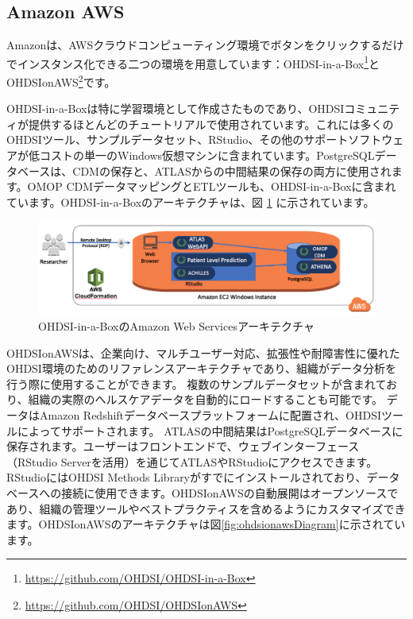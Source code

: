 \documentclass[
  11pt]{book}
\theoremstyle{definition}
\theoremstyle{definition}
\theoremstyle{definition}
\theoremstyle{definition}
\theoremstyle{remark}
\begin{document}
\subsection{Amazon AWS}\label{amazon-aws}

Amazonは、AWSクラウドコンピューティング環境でボタンをクリックするだけでインスタンス化できる二つの環境を用意しています：OHDSI-in-a-Box\footnote{\url{https://github.com/OHDSI/OHDSI-in-a-Box}}とOHDSIonAWS\footnote{\url{https://github.com/OHDSI/OHDSIonAWS}}です。 

OHDSI-in-a-Boxは特に学習環境として作成さたものであり、OHDSIコミュニティが提供するほとんどのチュートリアルで使用されています。これには多くのOHDSIツール、サンプルデータセット、RStudio、その他のサポートソフトウェアが低コストの単一のWindows仮想マシンに含まれています。PostgreSQLデータベースは、CDMの保存と、ATLASからの中間結果の保存の両方に使用されます。OMOP CDMデータマッピングとETLツールも、OHDSI-in-a-Boxに含まれています。OHDSI-in-a-Boxのアーキテクチャは、図 \ref{fig:ohdsiinaboxDiagram} に示されています。

\begin{figure}

{\centering \includegraphics[width=1\linewidth]{images/OhdsiAnalyticsTools/OHDSI-in-a-BoxDiagram} 

}

\caption{OHDSI-in-a-BoxのAmazon Web Servicesアーキテクチャ}\label{fig:ohdsiinaboxDiagram}
\end{figure}

OHDSIonAWSは、企業向け、マルチユーザー対応、拡張性や耐障害性に優れたOHDSI環境のためのリファレンスアーキテクチャであり、組織がデータ分析を行う際に使用することができます。 複数のサンプルデータセットが含まれており、組織の実際のヘルスケアデータを自動的にロードすることも可能です。 データはAmazon Redshiftデータベースプラットフォームに配置され、OHDSIツールによってサポートされます。 ATLASの中間結果はPostgreSQLデータベースに保存されます。ユーザーはフロントエンドで、ウェブインターフェース（RStudio Serverを活用）を通じてATLASやRStudioにアクセスできます。RStudioにはOHDSI Methods Libraryがすでにインストールされており、データベースへの接続に使用できます。OHDSIonAWSの自動展開はオープンソースであり、組織の管理ツールやベストプラクティスを含めるようにカスタマイズできます。OHDSIonAWSのアーキテクチャは図\ref{fig:ohdsionawsDiagram}に示されています。
\end{document}
